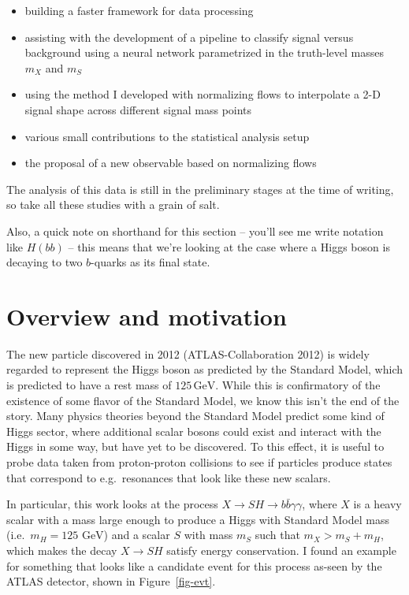 \documentclass[
  11pt,
  numbers=noendperiod]{book}
\providecommand{\tightlist}{%
  \setlength{\itemsep}{0pt}\setlength{\parskip}{0pt}}\usepackage{longtable,booktabs,array}
\begin{document}
\begin{itemize}
\tightlist
\item
  building a faster framework for data processing
\item
  assisting with the development of a pipeline to classify signal versus
  background using a neural network parametrized in the truth-level
  masses \(m_X\) and \(m_S\)
\item
  using the method I developed with normalizing flows to interpolate a
  2-D signal shape across different signal mass points
\item
  various small contributions to the statistical analysis setup
\item
  the proposal of a new observable based on normalizing flows
\end{itemize}

The analysis of this data is still in the preliminary stages at the time
of writing, so take all these studies with a grain of salt.

Also, a quick note on shorthand for this section -- you'll see me write
notation like \(H(bb)\) -- this means that we're looking at the case
where a Higgs boson is decaying to two \(b\)-quarks as its final state.

\hypertarget{overview-and-motivation}{%
\section{Overview and motivation}\label{overview-and-motivation}}

The new particle discovered in 2012 (ATLAS-Collaboration 2012) is widely
regarded to represent the Higgs boson as predicted by the Standard
Model, which is predicted to have a rest mass of \(125 \, \text{GeV}\).
While this is confirmatory of the existence of some flavor of the
Standard Model, we know this isn't the end of the story. Many physics
theories beyond the Standard Model predict some kind of Higgs sector,
where additional scalar bosons could exist and interact with the Higgs
in some way, but have yet to be discovered. To this effect, it is useful
to probe data taken from proton-proton collisions to see if particles
produce states that correspond to e.g.~resonances that look like these
new scalars.

In particular, this work looks at the process
\(X\rightarrow SH \rightarrow b\bar{b}\gamma\gamma\), where \(X\) is a
heavy scalar with a mass large enough to produce a Higgs with Standard
Model mass (i.e.~\(m_H = 125 \text{ GeV}\)) and a scalar \(S\) with mass
\(m_S\) such that \(m_X > m_S + m_H\), which makes the decay
\(X\rightarrow SH\) satisfy energy conservation. I found an example for
something that looks like a candidate event for this process as-seen by
the ATLAS detector, shown in Figure~\ref{fig-evt}.
\end{document}
